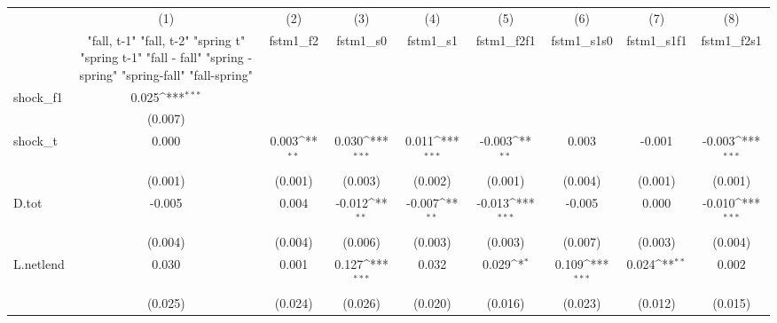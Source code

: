 {
\def\sym#1{\ifmmode^{#1}\else\(^{#1}\)\fi}
\begin{tabular}{l*{8}{c}}
\toprule
            &\multicolumn{1}{c}{(1)}&\multicolumn{1}{c}{(2)}&\multicolumn{1}{c}{(3)}&\multicolumn{1}{c}{(4)}&\multicolumn{1}{c}{(5)}&\multicolumn{1}{c}{(6)}&\multicolumn{1}{c}{(7)}&\multicolumn{1}{c}{(8)}\\
            &\multicolumn{1}{c}{  "fall, t-1" "fall, t-2" "spring t" "spring t-1"  "fall - fall" "spring - spring" "spring-fall" "fall-spring" }&\multicolumn{1}{c}{fstm1\_f2}&\multicolumn{1}{c}{fstm1\_s0}&\multicolumn{1}{c}{fstm1\_s1}&\multicolumn{1}{c}{fstm1\_f2f1}&\multicolumn{1}{c}{fstm1\_s1s0}&\multicolumn{1}{c}{fstm1\_s1f1}&\multicolumn{1}{c}{fstm1\_f2s1}\\
\midrule
shock\_f1    &       0.025\sym{***}&                     &                     &                     &                     &                     &                     &                     \\
            &     (0.007)         &                     &                     &                     &                     &                     &                     &                     \\
\addlinespace
shock\_t     &       0.000         &       0.003\sym{**} &       0.030\sym{***}&       0.011\sym{***}&      -0.003\sym{**} &       0.003         &      -0.001         &      -0.003\sym{***}\\
            &     (0.001)         &     (0.001)         &     (0.003)         &     (0.002)         &     (0.001)         &     (0.004)         &     (0.001)         &     (0.001)         \\
\addlinespace
D.tot       &      -0.005         &       0.004         &      -0.012\sym{**} &      -0.007\sym{**} &      -0.013\sym{***}&      -0.005         &       0.000         &      -0.010\sym{***}\\
            &     (0.004)         &     (0.004)         &     (0.006)         &     (0.003)         &     (0.003)         &     (0.007)         &     (0.003)         &     (0.004)         \\
\addlinespace
L.netlend   &       0.030         &       0.001         &       0.127\sym{***}&       0.032         &       0.029\sym{*}  &       0.109\sym{***}&       0.024\sym{**} &       0.002         \\
            &     (0.025)         &     (0.024)         &     (0.026)         &     (0.020)         &     (0.016)         &     (0.023)         &     (0.012)         &     (0.015)         \\

\end{tabular}}
